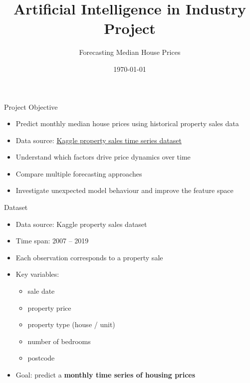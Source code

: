 \documentclass[slidescentered]{beamer}
\title{Artificial Intelligence in Industry Project}
\subtitle{Forecasting Median House Prices}
\date{\today}
\begin{document}
\begin{frame}[noframenumbering]
    \titlepage
\end{frame}

\begin{frame}{Project Objective}

    \begin{itemize}

        \item Predict monthly median house prices using historical property sales data
        \item Data source: \href{https://www.kaggle.com/datasets/htagholdings/property-sales}{Kaggle property sales time series dataset}

        \item Understand which factors drive price dynamics over time

        \item Compare multiple forecasting approaches

        \item Investigate unexpected model behaviour and improve the feature space

    \end{itemize}

\end{frame}

\begin{frame}{Dataset}

    \begin{itemize}

        \item Data source: Kaggle property sales dataset

        \item Time span: 2007 -- 2019

        \item Each observation corresponds to a property sale

        \item Key variables:

              \begin{itemize}
                  \item sale date
                  \item property price
                  \item property type (house / unit)
                  \item number of bedrooms
                  \item postcode
              \end{itemize}

        \item Goal: predict a \textbf{monthly time series of housing prices}

    \end{itemize}

\end{frame}
\end{document}
